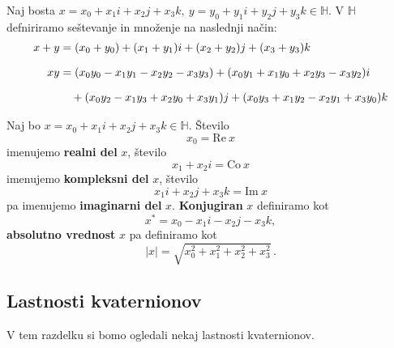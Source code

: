 \documentclass[mat1, tisk]{fmfdelo}
\numberwithin{equation}{section}
\begin{document}
\begin{definicija}
    Naj bosta $x = x_{0} + x_{1}i + x_{2}j + x_{3}k, \: y = y_{0} + y_{1}i + y_{2}j + y_{3}k \in \mathbb{H}$. V $\mathbb{H}$ defniriramo
    seštevanje in množenje na naslednji način:
    \begin{equation*}
        \setlength{\jot}{10pt}
            \begin{aligned}
                x + y &= (x_{0} + y_{0}) + (x_{1} + y_{1})  i + (x_{2} + y_{2})  j + (x_{3} + y_{3})  k \\
                xy &= (x_{0}y_{0} - x_{1}y_{1} - x_{2}y_{2} - x_{3}y_{3})
                    + (x_{0}y_{1} + x_{1}y_{0} + x_{2}y_{3} - x_{3}y_{2})i \\
                    & \quad + (x_{0}y_{2} - x_{1}y_{3} + x_{2}y_{0} + x_{3}y_{1})j
                            + (x_{0}y_{3} + x_{1}y_{2} - x_{2}y_{1} + x_{3}y_{0})k
            \end{aligned}
    \end{equation*}
\end{definicija}

\begin{definicija}
    Naj bo $x = x_{0} + x_{1}i + x_{2}j + x_{3}k \in \mathbb{H}$.
    Število
    \[x_{0} = \mathrm{Re} \: x \] 
    imenujemo \textbf{realni del} $x$,
    število
    \[ x_{1} + x_{2}i = \mathrm{Co} \: x \]
    imenujemo \textbf{kompleksni del} $x$,
    število
    \[ x_{1}i + x_{2}j + x_{3}k = \mathrm{Im} \: x \]
    pa imenujemo \textbf{imaginarni del} $x$.
    \textbf{Konjugiran} $x$ definiramo kot 
    \[ x^{*} = x_{0} - x_{1}i - x_{2}j - x_{3}k, \]
    \textbf{absolutno vrednost} $x$ pa definiramo kot 
    \[ |x| = \sqrt{x_{0}^2 + x_{1}^2 + x_{2}^2 + x_{3}^2} \, . \]
\end{definicija}

\subsection{Lastnosti kvaternionov}

V tem razdelku si bomo ogledali nekaj lastnosti kvaternionov.
\end{document}
